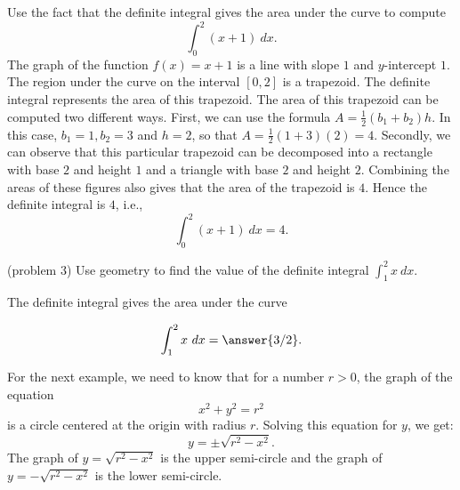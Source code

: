 \documentclass{ximera}
\begin{document}
\begin{example}[example 3]
Use the fact that the definite integral gives the area under the curve to compute
\[\int_0^2 (x+1) \ dx.\]
The graph of the function $f(x) = x+1$ is a line with slope $1$ and $y$-intercept $1$. 
The region under the curve on the interval $[0, 2]$ is a trapezoid.  
The definite integral represents the area of this trapezoid. The area of this trapezoid can be computed two different ways.  
First, we can use the formula $A = \frac12 (b_1 + b_2)h$. 
In this case, $b_1 = 1, b_2 = 3$ and $h = 2$, so that $A = \frac12 (1+3)(2) = 4$.  
Secondly, we can observe that this particular trapezoid can be decomposed into a 
rectangle with base $2$ and height $1$ and a triangle with base $2$ and height $2$. 
Combining the areas of these figures also gives that the area of the trapezoid is $4$.
Hence the definite integral is $4$, i.e.,
\[\int_0^2 (x+1) \ dx = 4.\]
 




\begin{image}
\end{image}

\end{example}


\begin{problem}(problem 3)
Use geometry to find the value of the definite integral $\displaystyle{\int_{1}^{2} x \ dx}.$
\begin{hint}
The definite integral gives the area under the curve
\end{hint}
\[\int_{1}^{2} x \ dx = \answer{3/2}.\]
\end{problem}

For the next example, we need to know that for a number $r>0$,
the graph of the equation
\[x^2 + y^2 = r^2\]
is a circle centered at the origin with radius $r$.
Solving this equation for $y$, we get:
\[y = \pm \sqrt{r^2 - x^2}.\]
The graph of $y = \sqrt{r^2 -x^2}$ is the upper semi-circle and the
graph of $y = -\sqrt{r^2 -x^2}$ is the lower semi-circle.
\end{document}
